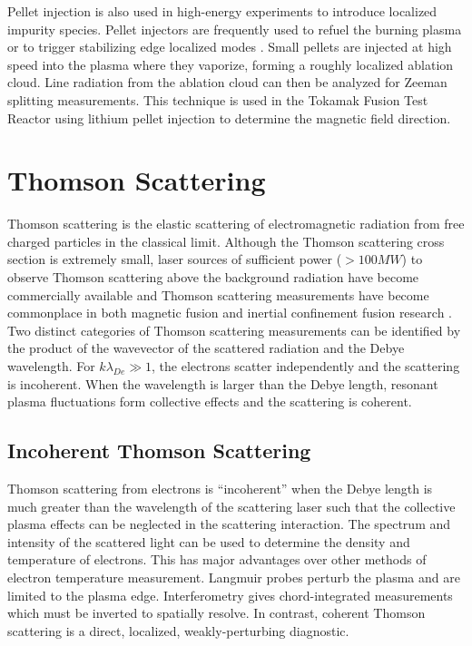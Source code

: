 \documentclass{jpp}
\begin{document}
Pellet injection is also used in high-energy experiments to introduce localized impurity species. Pellet injectors are frequently used to refuel the burning plasma or to trigger stabilizing edge localized modes \citep{BaylorL.R2015Emwp}. Small pellets are injected at high speed into the plasma where they vaporize, forming a roughly localized ablation cloud. Line radiation from the ablation cloud can then be analyzed for Zeeman splitting measurements. This technique is used in the Tokamak Fusion Test Reactor \citep{doi:10.1063/1.1141775} using lithium pellet injection to determine the magnetic field direction.

\section{Thomson Scattering}

Thomson scattering is the elastic scattering of electromagnetic radiation from free charged particles in the classical limit. Although the Thomson scattering cross section is extremely small, laser sources of sufficient power ($>100 MW$) to observe Thomson scattering above the background radiation have become commercially available and Thomson scattering measurements have become commonplace in both magnetic fusion and inertial confinement fusion research \citep{doi:10.1063/1.2336451}. Two distinct categories of Thomson scattering measurements can be identified by the product of the wavevector of the scattered radiation and the Debye wavelength. For $k \lambda_{De} \gg 1$, the electrons scatter independently and the scattering is incoherent. When the wavelength is larger than the Debye length, resonant plasma fluctuations form collective effects and the scattering is coherent.

\subsection{Incoherent Thomson Scattering}

Thomson scattering from electrons is ``incoherent'' when the Debye length is much greater than the wavelength of the scattering laser such that the collective plasma effects can be neglected in the scattering interaction. The spectrum and intensity of the scattered light can be used to determine the density and temperature of electrons. This has major advantages over other methods of electron temperature measurement. Langmuir probes perturb the plasma and are limited to the plasma edge. Interferometry gives chord-integrated measurements which must be inverted to spatially resolve. In contrast, coherent Thomson scattering is a direct, localized, weakly-perturbing diagnostic.
\end{document}
